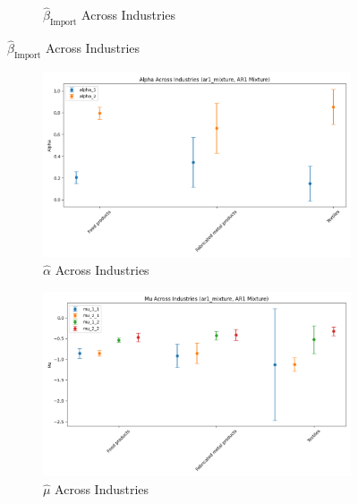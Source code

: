 \documentclass{article}
\begin{document}
\begin{figure}[ht!]
\begin{subfigure}[t]{0.32\textwidth}
        \caption{$\hat{\beta}_{\text{Import}}$ Across Industries}
    \end{subfigure}
\end{figure}


\begin{figure}[ht!]
    \centering 
    \caption{AR(1) Mixture Model Across Industries}
    \begin{subfigure}[t]{0.32\textwidth}
        \centering
        \includegraphics[width=\textwidth]{figure/ar1_mixture_alpha_across_industries.png}
        \caption{$\hat\alpha$ Across Industries}
    \end{subfigure}
    \begin{subfigure}[t]{0.32\textwidth}
        \centering
        \includegraphics[width=\textwidth]{figure/ar1_mixture_mu_across_industries.png}
        \caption{$\hat\mu$ Across Industries}
    \end{subfigure}
    \begin{subfigure}[t]{0.32\textwidth}
        \centering

\end{subfigure}
\end{figure}
\end{document}
